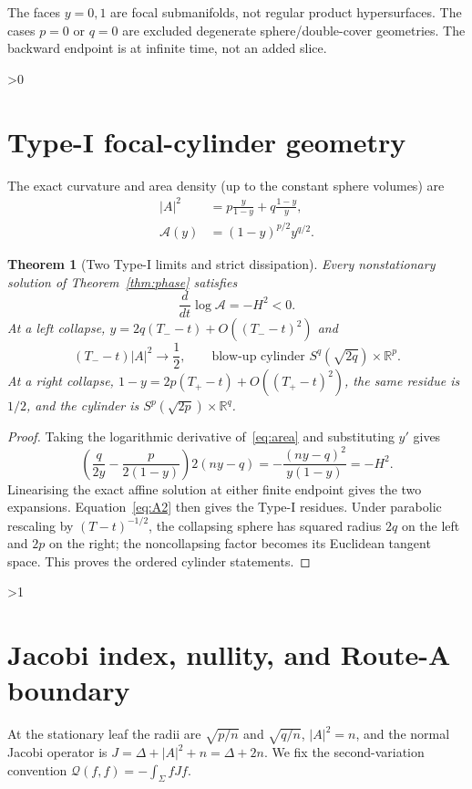 \documentclass[10pt]{article}
\providecommand{\CRevisionRound}{2}
\newtheorem{theorem}{Theorem}
\newcommand{\RR}{\mathbb R}
\begin{document}
The faces $y=0,1$ are focal submanifolds, not regular product
hypersurfaces.  The cases $p=0$ or $q=0$ are excluded degenerate
sphere/double-cover geometries.  The backward endpoint is at infinite time,
not an added slice.

\ifnum\CRevisionRound>0
\section{Type-I focal-cylinder geometry}
The exact curvature and area density (up to the constant sphere volumes) are
\begin{align}
 |A|^2&=p\frac y{1-y}+q\frac{1-y}y,\label{eq:A2}\\
 \mathcal A(y)&=(1-y)^{p/2}y^{q/2}.\label{eq:area}
\end{align}

\begin{theorem}[Two Type-I limits and strict dissipation]\label{thm:typeI}
Every nonstationary solution of Theorem~\ref{thm:phase} satisfies
\[
 \frac d{dt}\log\mathcal A=-H^2<0.
\]
At a left collapse, $y=2q(T_--t)+O((T_--t)^2)$ and
\[
 (T_--t)|A|^2\longrightarrow\frac12,\qquad
 \text{blow-up cylinder }S^q(\sqrt{2q})\times\RR^p.
\]
At a right collapse,
$1-y=2p(T_+-t)+O((T_+-t)^2)$, the same residue is $1/2$, and the cylinder is
$S^p(\sqrt{2p})\times\RR^q$.
\end{theorem}
\begin{proof}
Taking the logarithmic derivative of~\eqref{eq:area} and substituting $y'$
gives
\[
 \left(\frac q{2y}-\frac p{2(1-y)}\right)2(ny-q)
 =-\frac{(ny-q)^2}{y(1-y)}=-H^2.
\]
Linearising the exact affine solution at either finite endpoint gives the
two expansions.  Equation~\eqref{eq:A2} then gives the Type-I residues.
Under parabolic rescaling by $(T-t)^{-1/2}$, the collapsing sphere has
squared radius $2q$ on the left and $2p$ on the right; the noncollapsing
factor becomes its Euclidean tangent space.  This proves the ordered
cylinder statements.
\end{proof}
\fi

\ifnum\CRevisionRound>1
\section{Jacobi index, nullity, and Route-A boundary}
At the stationary leaf the radii are $\sqrt{p/n}$ and $\sqrt{q/n}$,
$|A|^2=n$, and the normal Jacobi operator is
$J=\Delta+|A|^2+n=\Delta+2n$.  We fix the second-variation convention
$\mathcal Q(f,f)=-\int_{\Sigma}fJf$.
\end{document}
